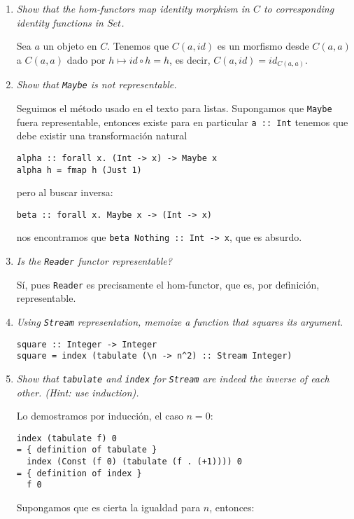\documentclass[11pt]{article}
\begin{document}
\begin{enumerate}
\item \textit{Show that the hom-functors map identity morphism in $C$ to corresponding identity functions in $Set$.}

Sea $a$ un objeto en $C$. Tenemos que $C(a,id)$ es un morfismo desde $C(a,a)$ a $C(a,a)$ dado por $h \mapsto id \circ h = h$, es decir, $C(a,id)=id_{C(a,a)}$.

\item \textit{Show that \texttt{Maybe} is not representable.}

Seguimos el método usado en el texto para listas. Supongamos que \texttt{Maybe} fuera representable, entonces existe para en particular \texttt{a :: Int} tenemos que debe existir una transformación natural
\begin{verbatim}
alpha :: forall x. (Int -> x) -> Maybe x
alpha h = fmap h (Just 1)
\end{verbatim}
pero al buscar inversa:
\begin{verbatim}
beta :: forall x. Maybe x -> (Int -> x)
\end{verbatim}
nos encontramos que \texttt{beta Nothing :: Int -> x}, que es absurdo.

\item \textit{Is the \texttt{Reader} functor representable?}

Sí, pues \texttt{Reader} es precisamente el hom-functor, que es, por definición, representable.

\item \textit{Using \texttt{Stream} representation, memoize a function that squares its argument.}

\begin{verbatim}
square :: Integer -> Integer
square = index (tabulate (\n -> n^2) :: Stream Integer)
\end{verbatim}

\item \textit{Show that \texttt{tabulate} and \texttt{index} for \texttt{Stream} are indeed the inverse of each other. (Hint: use induction).}

Lo demostramos por inducción, el caso $n=0$:

\begin{verbatim}
index (tabulate f) 0
= { definition of tabulate }
  index (Const (f 0) (tabulate (f . (+1)))) 0
= { definition of index }
  f 0
\end{verbatim}

Supongamos que es cierta la igualdad para $n$, entonces:


\end{enumerate}
\end{document}
